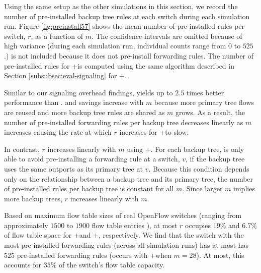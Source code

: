 Using the same setup as the other simulations in this section, we record the number of pre-installed backup tree rules at each switch during each simulation run.  
Figure \ref{fig:preinstall57} shows the mean number of pre-installed rules per switch, $r$, as a function of $m$. 
The confidence intervals are omitted because of high variance (during each simulation run, individual counts range from $0$ to $525$.) 
\post is not included because it does not pre-install forwarding rules.  The number of pre-installed rules for \pres+\lb is computed using the same algorithm described in Section 
\ref{subsubsec:eval-signaling} for \posts+\lbs. %

Similar to our \post signaling overhead findings, \merge yields up to $2.5$ times better performance than \bases.
\merge and \lb savings increase with $m$ because more primary tree flows are reused and more backup tree rules are shared as $m$ grows.
As a result, the number of pre-installed forwarding rules per backup tree decreases linearly as $m$ increases causing the rate at which $r$ increases for \pres+\merge to slow.

In contrast, $r$ increases linearly with $m$ using \pres+\bases. For each backup tree, \base is only able to avoid pre-installing a forwarding rule at a switch, $v$,
if the backup tree uses the same outports as its primary tree at $v$.  Because this condition depends only on the relationship between a backup tree and its primary tree, the number of
pre-installed rules per backup tree is constant for all $m$.  Since larger $m$ implies more backup trees, $r$ increases linearly with $m$.   

Based on maximum flow table sizes of real OpenFlow switches (ranging from approximately $1500$ to $1900$ flow table entries \cite{Curtis11,Ferguson13}), at most $r$ occupies  
$19\%$ and $6.7\%$ of flow table space for \pres+\base and \pres+\merges, respectively.  We find that the switch with the most pre-installed forwarding rules (across all simulation runs) 
has at most has $525$ pre-installed forwarding rules (occurs with \pres+\base when $m=28$).  At most, this accounts for $35\%$ of the switch's flow table capacity. %



